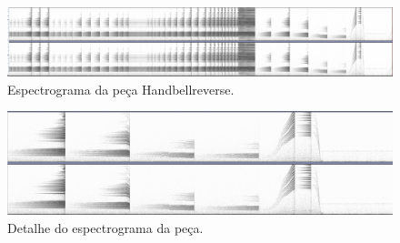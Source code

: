 \begin{figure}

\includegraphics[width=1\textwidth]{pictures/cap4/handbellreverse}
\caption{\label{handbell}Espectrograma da peça Handbellreverse.}
\label{fig:handbell}
\end{figure}








\begin{figure}

\includegraphics[width=1\textwidth]{pictures/cap4/handbellreverse_detail}
\caption{\label{handbelldt}Detalhe do espectrograma da peça.}
\label{fig:handbelldt}
\end{figure}


